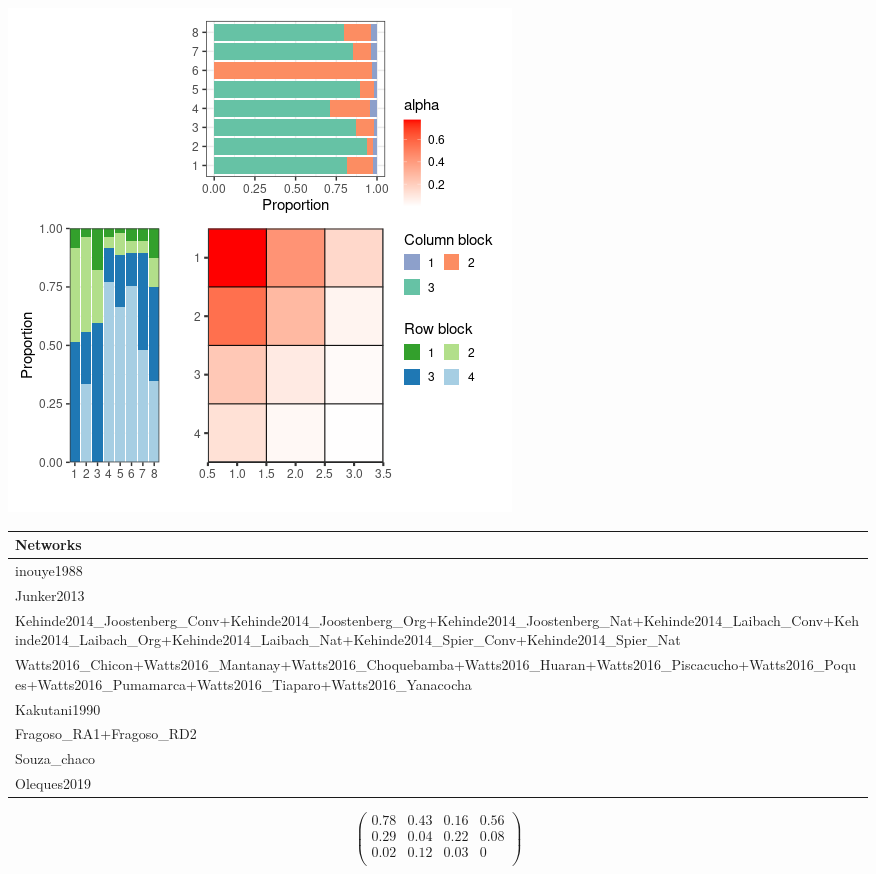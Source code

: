 \includegraphics{./img/f5433f933dadae33c549c51d26316f90eb2bbdcd.png}\newline \tiny

\begin{tabular}{l}
\toprule
Networks\\
\midrule
inouye1988\\
Junker2013\\
Kehinde2014\_Joostenberg\_Conv+Kehinde2014\_Joostenberg\_Org+Kehinde2014\_Joostenberg\_Nat+Kehinde2014\_Laibach\_Conv+Kehinde2014\_Laibach\_Org+Kehinde2014\_Laibach\_Nat+Kehinde2014\_Spier\_Conv+Kehinde2014\_Spier\_Nat\\
Watts2016\_Chicon+Watts2016\_Mantanay+Watts2016\_Choquebamba+Watts2016\_Huaran+Watts2016\_Piscacucho+Watts2016\_Poques+Watts2016\_Pumamarca+Watts2016\_Tiaparo+Watts2016\_Yanacocha\\
Kakutani1990\\
\addlinespace
Fragoso\_RA1+Fragoso\_RD2\\
Souza\_chaco\\
Oleques2019\\
\bottomrule
\end{tabular}

\normalsize\newline\[\begin{pmatrix} 0.78 &0.43 &0.16 &0.56 \\0.29 &0.04 &0.22 &0.08 \\0.02 &0.12 &0.03 &0 \\ \end{pmatrix}\]


